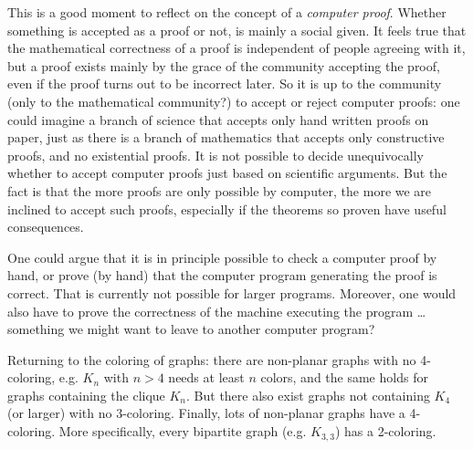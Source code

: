 This is a good moment to reflect on the concept of a {\em computer
  proof}. Whether something is accepted as a proof or not, is mainly a
social given. It feels true that the mathematical correctness of a
proof is independent of people agreeing with it, but a proof exists
mainly by the grace of the community accepting the proof, even if the
proof turns out to be incorrect later. So it is up to the community
(only to the mathematical community?) to accept or reject computer
proofs: one could imagine a branch of science that accepts only hand
written proofs on paper, just as there is a branch of mathematics that
accepts only constructive proofs, and no existential proofs. It is not
possible to decide unequivocally whether to accept computer proofs just
based on scientific arguments. But the fact is that the more proofs are
only possible by computer, the more we are inclined to accept such
proofs, especially if the theorems so proven have useful consequences.

One could argue that it is in principle possible to check a computer
proof by hand, or prove (by hand) that the computer program generating
the proof is correct. That is currently not possible for larger
programs. Moreover, one would also have to prove the correctness of
the machine executing the program \ldots something we might want to
leave to another computer program?

Returning to the coloring of graphs: there are non-planar graphs with
no 4-coloring, e.g. $K_{n}$ with $n > 4$ needs at least $n$ colors,
and the same holds for graphs containing the clique $K_n$. But there also
exist graphs not containing $K_4$ (or larger) with no
3-coloring. Finally, lots of non-planar graphs have a 4-coloring. More
specifically, every bipartite graph (e.g. $K_{3,3}$) has a 2-coloring.


